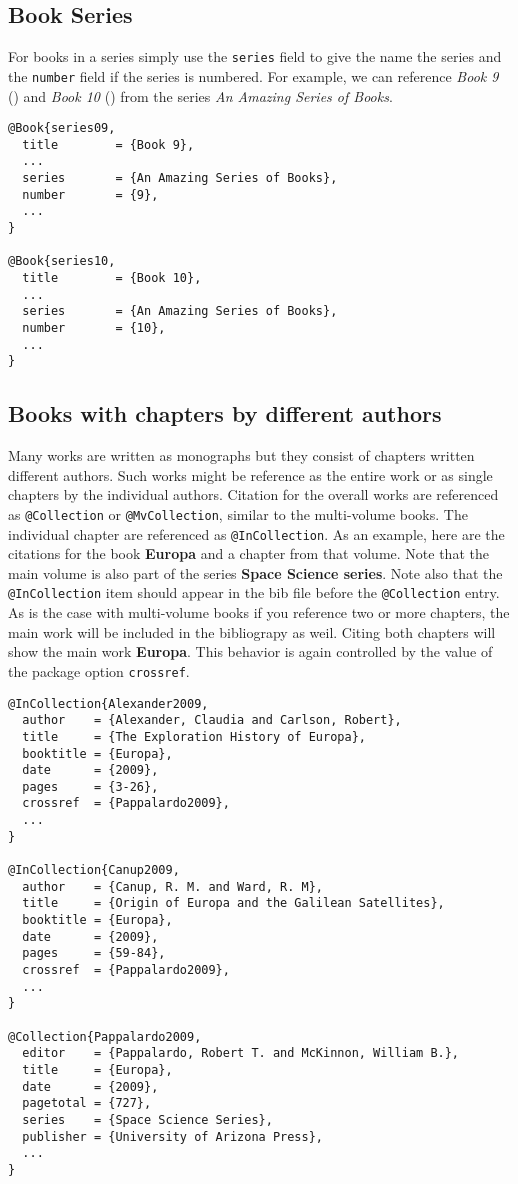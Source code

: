 \subsection{Book Series}

For books in a series simply use the \texttt{series} field to give
the name the series and the \texttt{number} field if the series is
numbered. For example, we can reference \textit{Book 9}
(\cite{book09}) and \textit{Book 10} (\cite{book10}) from the series
\textit{An Amazing Series of Books}.

\begin{verbatim}
@Book{series09,
  title        = {Book 9},
  ...
  series       = {An Amazing Series of Books},
  number       = {9},
  ...
}

@Book{series10,
  title        = {Book 10},
  ...
  series       = {An Amazing Series of Books},
  number       = {10},
  ...
}
\end{verbatim}


\subsection{Books with chapters by different authors}

Many works are written as monographs but they consist of chapters
written different authors. Such works might be reference as the entire
work or as single chapters by the individual authors. Citation for the
overall works are referenced as \texttt{@Collection} or
\texttt{@MvCollection}, similar to the multi-volume books.  The
individual chapter are referenced as \texttt{@InCollection}. As an
example, here are the citations for the book {\bfseries Europa} and a
chapter from that volume.  Note that the main volume is also part of
the series {\bfseries Space Science series}. Note also that the
\texttt{@InCollection} item should appear in the bib file before
the \texttt{@Collection} entry. As is the case with multi-volume
books if you reference two or more chapters, the main work will be
included in the bibliograpy as weil. Citing both chapters
\cite{Alexander2009, Canup2009} will show the main work {\bfseries
  Europa}. This behavior is again controlled by the value of the
package option \texttt{crossref}.


\begin{verbatim}
@InCollection{Alexander2009,
  author    = {Alexander, Claudia and Carlson, Robert},
  title     = {The Exploration History of Europa},
  booktitle = {Europa},
  date      = {2009},
  pages     = {3-26},
  crossref  = {Pappalardo2009},
  ...
}

@InCollection{Canup2009,
  author    = {Canup, R. M. and Ward, R. M},
  title     = {Origin of Europa and the Galilean Satellites},
  booktitle = {Europa},
  date      = {2009},
  pages     = {59-84},
  crossref  = {Pappalardo2009},
  ...
}

@Collection{Pappalardo2009,
  editor    = {Pappalardo, Robert T. and McKinnon, William B.},
  title     = {Europa},
  date      = {2009},
  pagetotal = {727},
  series    = {Space Science Series},
  publisher = {University of Arizona Press},
  ...
}
\end{verbatim}

